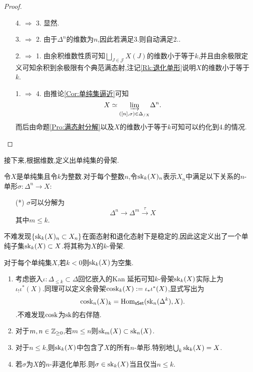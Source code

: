 \begin{proof}
\begin{enumerate}
    \item[4. $\Rightarrow$ 3.]显然.
    \item[3. $\Rightarrow$ 2.]由于$\Delta^n$的维数为$n$,因此若满足3.则自动满足2..
    \item[2. $\Rightarrow$ 1.]由余积维数性质可知$\bigsqcup_{J\in \mathcal{J}} X(J)$的维数小于等于$k$,并且由余极限定义可知余积到余极限有个典范满态射,注记\ref{Rk:退化单形}说明$X$的维数小于等于$k$.
    \item[1. $\Rightarrow$ 4.]由推论\ref{Cor:单纯集逼近}可知
    \[
    X\simeq \underset{([n],\sigma)\in \Delta_{/X}}{\underrightarrow{\lim}}\Delta^n.
    \]
    而后由命题\ref{Pro:满态射分解}以及$X$的维数小于等于$k$可知可以约化到4.的情况.
\end{enumerate}
\end{proof}
接下来,根据维数,定义出单纯集的骨架.
\begin{definition}[骨架]
    令$X$是单纯集且令$k$为整数.对于每个整数$n$,令$\operatorname{sk}_k(X)_n$表示$X_n$中满足以下关系的$n$-单形$\sigma : \Delta^n \to X$:
    \begin{itemize}
        \item[(*)]$\sigma$可以分解为
        \[
        \Delta^n \to \Delta^m \xrightarrow{\tau} X
        \]
        其中$m \leq k$.
    \end{itemize}
\end{definition}
不难发现$\{\operatorname{sk}_k(X)_n \subset X_n\}$在面态射和退化态射下是稳定的,因此这定义出了一个单纯子集$\operatorname{sk}_k(X) \subset X$.将其称为$X$的$k$-骨架.
\begin{example}
    对于每个单纯集$X$,若$k <0$则$\operatorname{sk}_k (X)$为空集.
\end{example}
\begin{remark}\label{Rk:单纯集骨架观察}
    \begin{enumerate}
        \item 考虑嵌入$\iota:\Delta_{\leq k} \subset \Delta$回忆嵌入的Kan 延拓可知$k$-骨架$\operatorname{sk}_k(X)$实际上为$\iota_!\iota^* (X)$.同理可以定义余骨架$\operatorname{cosk}_k(X):= \iota_*\iota^*(X)$,显式写出为\[
        \operatorname{cosk}_n(X)_k = \operatorname{Hom}_{\mathsf{sSet}}(\operatorname{sk}_n(\Delta^k),X).
        \].不难发现$\operatorname{cosk}$为$\operatorname{sk}$的右伴随.
        \item 对于$m,n\in \mathbb{Z}_{\geq 0}$,若$m \leq n$则$\operatorname{sk}_m(X)\subset \operatorname{sk}_n(X)$.
        \item 对于$n \leq k$,则$\operatorname{sk}_k(X)$中包含了$X$的所有$n$-单形.特别地$\bigcup_k \operatorname{sk}_k(X) = X$.
        \item 若$\sigma$为$X$的$n$-非退化单形.则$\sigma \in \operatorname{sk}_k(X)$当且仅当$n \leq k$.
    \end{enumerate}
\end{remark}
